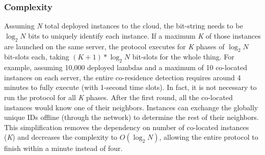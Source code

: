 \subsubsection{Complexity}
\label{sec:protocol:complexity}
Assuming \textit{N} total deployed instances to the cloud, the bit-string needs
to be $\log_2N$ bits to uniquely identify each instance. If a maximum \textit{K}
of those instances are launched on the same server, the protocol executes for
\textit{K} phases of $\log_2N$ bit-slots each, taking $(K+1)*\log_2N$ bit-slots
for the whole thing. For example, assuming 10,000 deployed lambdas and a maximum
of 10 co-located instances on each server, the entire  co-residence detection
requires around 4 minutes to fully execute (with 1-second time slots).  In fact,
it is not necessary to run the protocol for all \textit{K} phases. After the
first round, all the co-located instances would know one of their neighbors.
 Instances can exchange the globally
unique IDs offline (through the network) to determine the rest of their
neighbors.  This simplification removes the dependency on number of co-located
instances (\textit{K}) and decreases the complexity to $O(\log_2N)$, allowing
the entire protocol to finish within a minute instead of four.


